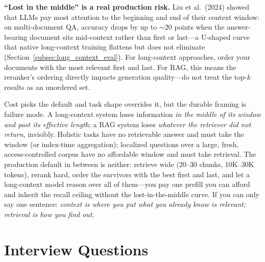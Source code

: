 \begin{warningbox}
\textbf{``Lost in the middle'' is a real production risk.} Liu et al.\ (2024) showed that LLMs pay most attention to the beginning and end of their context window: on multi-document QA, accuracy drops by up to $\sim$20 points when the answer-bearing document sits mid-context rather than first or last---a U-shaped curve that native long-context training flattens but does not eliminate (Section~\ref{subsec:long_context_eval}). For long-context approaches, order your documents with the most relevant first and last. For RAG, this means the reranker's ordering directly impacts generation quality---do not treat the top-$k$ results as an unordered set.
\end{warningbox}

\begin{keyinsight}
Cost picks the default and task shape overrides it, but the durable framing is failure mode. A long-context system loses information \emph{in the middle of its window and past its effective length}; a RAG system loses \emph{whatever the retriever did not return}, invisibly. Holistic tasks have no retrievable answer and must take the window (or index-time aggregation); localized questions over a large, fresh, access-controlled corpus have no affordable window and must take retrieval. The production default in between is neither: retrieve wide (20--30 chunks, 10K--30K tokens), rerank hard, order the survivors with the best first and last, and let a long-context model reason over all of them---you pay one prefill you can afford and inherit the recall ceiling without the lost-in-the-middle curve. If you can only say one sentence: \emph{context is where you put what you already know is relevant; retrieval is how you find out.}
\end{keyinsight}

\section{Interview Questions}
\label{sec:rag_interview}

